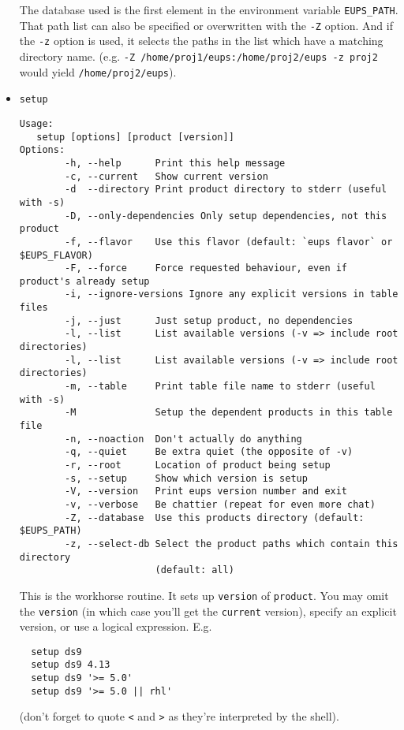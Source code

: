 \documentclass{article}
\newcommand{\code}[1]{\texttt{#1}}
\begin{document}
\begin{itemize}
The database used is the first element in the environment
variable \code{EUPS\_PATH}. That path list can also be specified or
overwritten with the \code{-Z} option. And if the \code{-z} option is
used, it selects the paths in the list which have a matching directory
name. (e.g. \code{-Z /home/proj1/eups:/home/proj2/eups -z proj2} would
yield \code{/home/proj2/eups}).


\item \code{setup}
\begin{verbatim}
Usage:
   setup [options] [product [version]]
Options:
        -h, --help      Print this help message
        -c, --current   Show current version
        -d  --directory Print product directory to stderr (useful with -s)
        -D, --only-dependencies Only setup dependencies, not this product	
        -f, --flavor    Use this flavor (default: `eups flavor` or $EUPS_FLAVOR)
        -F, --force     Force requested behaviour, even if product's already setup
        -i, --ignore-versions Ignore any explicit versions in table files
        -j, --just      Just setup product, no dependencies
        -l, --list      List available versions (-v => include root directories)
        -l, --list      List available versions (-v => include root directories)
        -m, --table     Print table file name to stderr (useful with -s)
        -M              Setup the dependent products in this table file
        -n, --noaction  Don't actually do anything
        -q, --quiet     Be extra quiet (the opposite of -v)
        -r, --root      Location of product being setup
        -s, --setup     Show which version is setup
        -V, --version   Print eups version number and exit
        -v, --verbose   Be chattier (repeat for even more chat)
        -Z, --database  Use this products directory (default: $EUPS_PATH)
        -z, --select-db Select the product paths which contain this directory 
                        (default: all)
\end{verbatim}				%

This is the workhorse routine. It sets up \code{version} of \code{product}. You
may omit the \code{version} (in which case you'll get the \code{current} version),
specify an explicit version, or use a logical expression. E.g.
\begin{verbatim}
  setup ds9
  setup ds9 4.13
  setup ds9 '>= 5.0'
  setup ds9 '>= 5.0 || rhl'
\end{verbatim}
(don't forget to quote \code{<} and \code{>} as they're interpreted by the shell).


\end{itemize}
\end{document}
